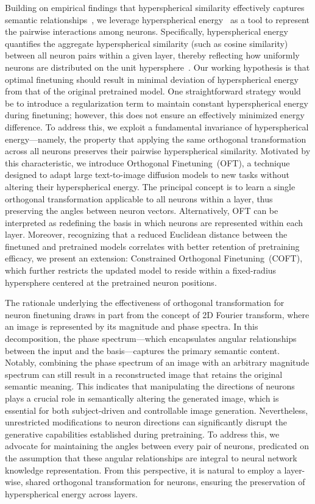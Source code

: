 Building on empirical findings that hyperspherical similarity effectively captures semantic relationships~\cite{liu2017deep,liu2018decoupled,chen2020angular}, we leverage hyperspherical energy~\cite{liu2018learning} as a tool to represent the pairwise interactions among neurons. Specifically, hyperspherical energy quantifies the aggregate hyperspherical similarity (such as cosine similarity) between all neuron pairs within a given layer, thereby reflecting how uniformly neurons are distributed on the unit hypersphere~\cite{liu2021learning}. Our working hypothesis is that optimal finetuning should result in minimal deviation of hyperspherical energy from that of the original pretrained model. One straightforward strategy would be to introduce a regularization term to maintain constant hyperspherical energy during finetuning; however, this does not ensure an effectively minimized energy difference. To address this, we exploit a fundamental invariance of hyperspherical energy—namely, the property that applying the same orthogonal transformation across all neurons preserves their pairwise hyperspherical similarity. Motivated by this characteristic, we introduce Orthogonal Finetuning~(OFT), a technique designed to adapt large text-to-image diffusion models to new tasks without altering their hyperspherical energy. The principal concept is to learn a single orthogonal transformation applicable to all neurons within a layer, thus preserving the angles between neuron vectors. Alternatively, OFT can be interpreted as redefining the basis in which neurons are represented within each layer. Moreover, recognizing that a reduced Euclidean distance between the finetuned and pretrained models correlates with better retention of pretraining efficacy, we present an extension: Constrained Orthogonal Finetuning~(COFT), which further restricts the updated model to reside within a fixed-radius hypersphere centered at the pretrained neuron positions.

The rationale underlying the effectiveness of orthogonal transformation for neuron finetuning draws in part from the concept of 2D Fourier transform, where an image is represented by its magnitude and phase spectra. In this decomposition, the phase spectrum—which encapsulates angular relationships between the input and the basis—captures the primary semantic content. Notably, combining the phase spectrum of an image with an arbitrary magnitude spectrum can still result in a reconstructed image that retains the original semantic meaning. This indicates that manipulating the directions of neurons plays a crucial role in semantically altering the generated image, which is essential for both subject-driven and controllable image generation. Nevertheless, unrestricted modifications to neuron directions can significantly disrupt the generative capabilities established during pretraining. To address this, we advocate for maintaining the angles between every pair of neurons, predicated on the assumption that these angular relationships are integral to neural network knowledge representation. From this perspective, it is natural to employ a layer-wise, shared orthogonal transformation for neurons, ensuring the preservation of hyperspherical energy across layers.

